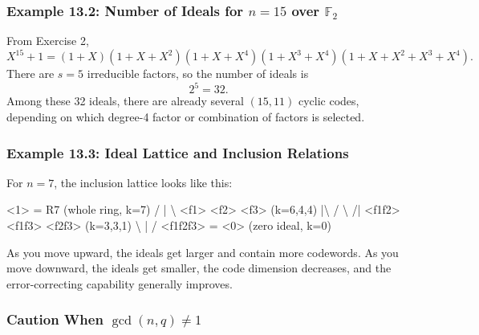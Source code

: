 \documentclass[11pt,oneside]{book}
\newenvironment{Shaded}{}{}
\newcommand{\NormalTok}[1]{#1}
\theoremstyle{plain}
\theoremstyle{definition}
\theoremstyle{remark}
\begin{document}
\subsubsection{\texorpdfstring{Example 13.2: Number of Ideals for
\(n=15\) over
\(\mathbb{F}_2\)}{Example 13.2: Number of Ideals for n=15 over \textbackslash mathbb\{F\}\_2}}\label{example-13.2-number-of-ideals-for-n15-over-mathbbf_2}

From Exercise 2,
\[X^{15}+1 = (1+X)(1+X+X^2)(1+X+X^4)(1+X^3+X^4)(1+X+X^2+X^3+X^4).\]
There are \(s=5\) irreducible factors, so the number of ideals is
\[2^5=32.\] Among these 32 ideals, there are already several \((15,11)\)
cyclic codes, depending on which degree-4 factor or combination of
factors is selected.

\subsubsection{Example 13.3: Ideal Lattice and Inclusion
Relations}\label{example-13.3-ideal-lattice-and-inclusion-relations}

For \(n=7\), the inclusion lattice looks like this:

\begin{Shaded}
\begin{Highlighting}[]
\NormalTok{        \textless{}1\textgreater{} = R7  (whole ring, k=7)}
\NormalTok{       / |  \textbackslash{}}
\NormalTok{   \textless{}f1\textgreater{} \textless{}f2\textgreater{} \textless{}f3\textgreater{}   (k=6,4,4)}
\NormalTok{     |\textbackslash{} / \textbackslash{} /|}
\NormalTok{  \textless{}f1f2\textgreater{} \textless{}f1f3\textgreater{} \textless{}f2f3\textgreater{}  (k=3,3,1)}
\NormalTok{       \textbackslash{}  |  /}
\NormalTok{      \textless{}f1f2f3\textgreater{} = \textless{}0\textgreater{}  (zero ideal, k=0)}
\end{Highlighting}
\end{Shaded}

As you move upward, the ideals get larger and contain more codewords. As
you move downward, the ideals get smaller, the code dimension decreases,
and the error-correcting capability generally improves.

\subsubsection{\texorpdfstring{Caution When
\(\gcd(n,q) \neq 1\)}{Caution When \textbackslash gcd(n,q) \textbackslash neq 1}}\label{caution-when-gcdnq-neq-1}
\end{document}

